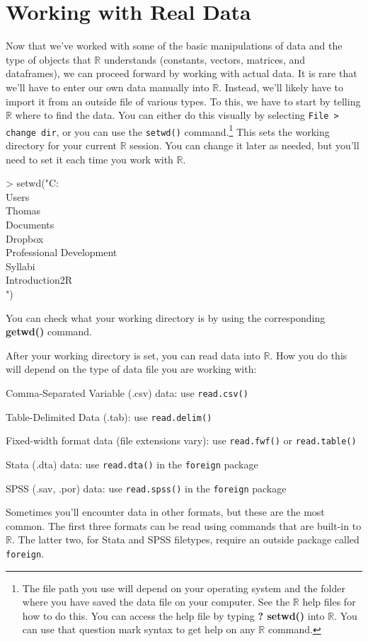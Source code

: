 \documentclass[12pt]{article}
\begin{document}
\section{Working with Real Data}\label{sec:data}
Now that we've worked with some of the basic manipulations of data and the type of objects that $\mathbb{R}$ understands (constants, vectors, matrices, and dataframes), we can proceed forward by working with actual data. It is rare that we'll have to enter our own data manually into $\mathbb{R}$. Instead, we'll likely have to import it from an outside file of various types. To this, we have to start by telling $\mathbb{R}$ where to find the data. You can either do this visually by selecting \verb|File > change dir|, or you can use the \verb|setwd()| command.\footnote{The file path you use will depend on your operating system and the folder where you have saved the data file on your computer. See the $\mathbb{R}$ help files for how to do this. You can access the help file by typing \textbf{? setwd()} into $\mathbb{R}$. You can use that question mark syntax to get help on any $\mathbb{R}$ command.} This sets the working directory for your current $\mathbb{R}$ session. You can change it later as needed, but you'll need to set it each time you work with $\mathbb{R}$.
\begin{Schunk}
\begin{Sinput}
> setwd("C:\\Users\\Thomas\\Documents\\Dropbox\\Professional Development\\Syllabi\\Introduction2R\\")
\end{Sinput}
\end{Schunk}
You can check what your working directory is by using the corresponding \textbf{getwd()} command.

After your working directory is set, you can read data into $\mathbb{R}$.  How you do this will depend on the type of data file you are working with:
\begin{itemize*}
\item Comma-Separated Variable (.csv) data: use \verb|read.csv()|
\item Table-Delimited Data (.tab): use \verb|read.delim()|
\item Fixed-width format data (file extensions vary): use \verb|read.fwf()| or \verb|read.table()|
\item Stata (.dta) data: use \verb|read.dta()| in the \verb|foreign| package
\item SPSS (.sav, .por) data: use \verb|read.spss()| in the \verb|foreign| package
\end{itemize*}
Sometimes you'll encounter data in other formats, but these are the most common. The first three formats can be read using commands that are built-in to $\mathbb{R}$. The latter two, for Stata and SPSS filetypes, require an outside package called \verb|foreign|.
\end{document}
